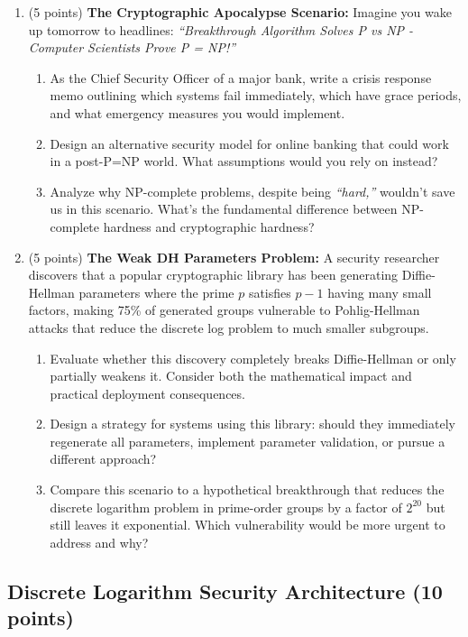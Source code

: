 \documentclass[10pt,a4paper,american]{exam}
\begin{document}
\begin{enumerate}
	\item (5 points) \textbf{The Cryptographic Apocalypse Scenario:}
	      Imagine you wake up tomorrow to headlines: \textit{``Breakthrough Algorithm Solves P vs NP - Computer Scientists Prove P = NP!''}
	      \begin{enumerate}
		      \item As the Chief Security Officer of a major bank, write a crisis response memo outlining which systems fail immediately, which have grace periods, and what emergency measures you would implement.
		      \item Design an alternative security model for online banking that could work in a post-P=NP world. What assumptions would you rely on instead?
		      \item Analyze why NP-complete problems, despite being \textit{``hard,''} wouldn't save us in this scenario. What's the fundamental difference between NP-complete hardness and cryptographic hardness?
	      \end{enumerate}
	\item (5 points) \textbf{The Weak DH Parameters Problem:}
	      A security researcher discovers that a popular cryptographic library has been generating Diffie-Hellman parameters where the prime $p$ satisfies $p-1$ having many small factors, making 75\% of generated groups vulnerable to Pohlig-Hellman attacks that reduce the discrete log problem to much smaller subgroups.
	      \begin{enumerate}
		      \item Evaluate whether this discovery completely breaks Diffie-Hellman or only partially weakens it. Consider both the mathematical impact and practical deployment consequences.
		      \item Design a strategy for systems using this library: should they immediately regenerate all parameters, implement parameter validation, or pursue a different approach?
		      \item Compare this scenario to a hypothetical breakthrough that reduces the discrete logarithm problem in prime-order groups by a factor of $2^{20}$ but still leaves it exponential. Which vulnerability would be more urgent to address and why?
	      \end{enumerate}
\end{enumerate}

\subsection{Discrete Logarithm Security Architecture (10 points)}
\end{document}
